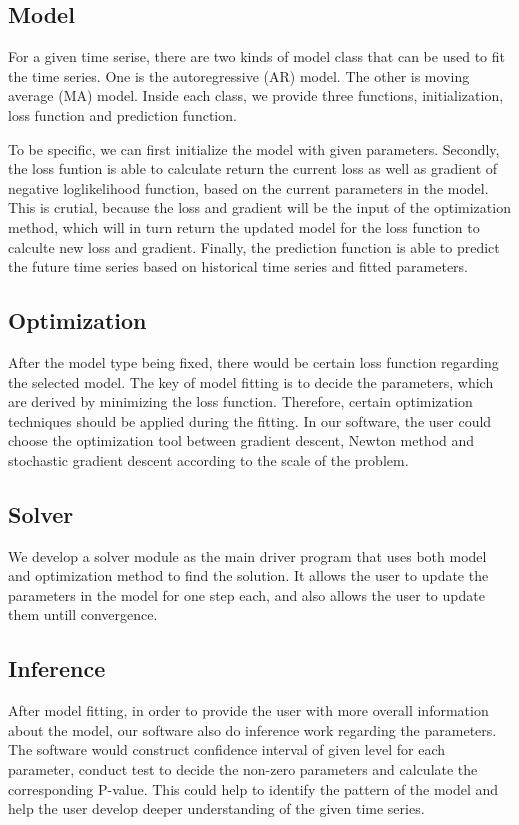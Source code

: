 \documentclass[12pt,a4paper]{article}
\begin{document}
\subsection{Model}
For a given time serise, there are two kinds of model class that can be used to fit the time series. One is the autoregressive  (AR) model. The other is moving average (MA) model. Inside each class, we provide three functions, initialization, loss function and prediction function. 

To be specific, we can first initialize the model with given parameters. Secondly, the loss funtion is able to calculate return the current loss as well as gradient of negative loglikelihood function, based on the current parameters in the model. This is crutial, because the loss and gradient will be the input of the optimization method, which will in turn return the updated model for the loss function to calculte new loss and gradient. Finally, the prediction function is able to predict the future time series based on historical time series and fitted parameters.


\subsection{Optimization}
After the model type being fixed, there would be certain loss function regarding the selected model. The key of model fitting is to decide the parameters, which are derived by minimizing the loss function. Therefore, certain optimization techniques should be applied during the fitting. In our software, the user could choose the optimization tool between gradient descent, Newton method and stochastic gradient descent according to the scale of the problem.

\subsection{Solver}
We develop a solver module as the main driver program that uses both model and optimization method to find the solution. It allows the user to update the parameters in the model for one step each, and also allows the user to update them untill convergence.

\subsection{Inference}
After model fitting, in order to provide the user with more overall information about the model, our software also do inference work regarding the parameters. The software would construct confidence interval of given level for each parameter, conduct test to decide the non-zero parameters and calculate the corresponding P-value. This could help to identify the pattern of the model and help the user develop deeper understanding of the given time series.
\end{document}
